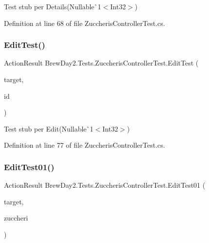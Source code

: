 Test stub per Details(Nullable\`{}1$<$Int32$>$)



Definition at line 68 of file Zuccheris\+Controller\+Test.\+cs.

\mbox{\label{class_brew_day2_1_1_tests_1_1_zuccheris_controller_test_afe22bd2a1befc8a0e2a0a87a647d132c}} 
\subsubsection{\texorpdfstring{Edit\+Test()}{EditTest()}}
{\footnotesize\ttfamily Action\+Result Brew\+Day2.\+Tests.\+Zuccheris\+Controller\+Test.\+Edit\+Test (\begin{DoxyParamCaption}\item[{\mbox{[}\+Pex\+Assume\+Under\+Test\mbox{]} \mbox{\hyperlink{class_brew_day2_1_1_controllers_1_1_zuccheris_controller}{Zuccheris\+Controller}}}]{target,  }\item[{int?}]{id }\end{DoxyParamCaption})}



Test stub per Edit(Nullable\`{}1$<$Int32$>$)



Definition at line 77 of file Zuccheris\+Controller\+Test.\+cs.

\mbox{\label{class_brew_day2_1_1_tests_1_1_zuccheris_controller_test_aa0c503908420f07be58ae9acc5e9cdcd}} 
\subsubsection{\texorpdfstring{Edit\+Test01()}{EditTest01()}}
{\footnotesize\ttfamily Action\+Result Brew\+Day2.\+Tests.\+Zuccheris\+Controller\+Test.\+Edit\+Test01 (\begin{DoxyParamCaption}\item[{\mbox{[}\+Pex\+Assume\+Under\+Test\mbox{]} \mbox{\hyperlink{class_brew_day2_1_1_controllers_1_1_zuccheris_controller}{Zuccheris\+Controller}}}]{target,  }\item[{\mbox{\hyperlink{class_brew_day2_1_1_models_1_1_zuccheri}{Zuccheri}}}]{zuccheri }\end{DoxyParamCaption})}



